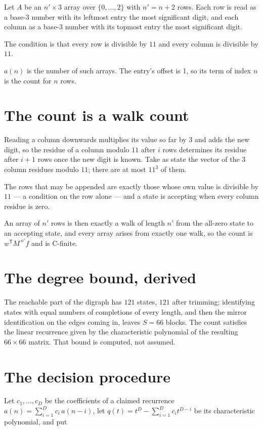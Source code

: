 \documentclass[11pt]{article}
\theoremstyle{definition}
\begin{document}
Let $A$ be an $n' \times 3$ array over $\{0,\dots,2\}$ with $n' = n + 2$ rows. Each row is read as a base-$3$ number with its leftmost entry the most significant digit, and each column as a base-$3$ number with its topmost entry the most significant digit.

The condition is that every row is divisible by $11$ and every column is divisible by $11$.

$a(n)$ is the number of such arrays. The entry's offset is 1, so its term of index $n$ is the count for $n$ rows.

\section{The count is a walk count}

Reading a column downwards multiplies its value so far by $3$ and adds the new digit, so the residue of a column modulo $11$ after $i$ rows determines its residue after $i+1$ rows once the new digit is known. Take as state the vector of the $3$ column residues modulo $11$; there are at most $11^{3}$ of them.

The rows that may be appended are exactly those whose own value is divisible by $11$ --- a condition on the row alone --- and a state is accepting when every column residue is zero.

An array of $n'$ rows is then exactly a walk of length $n'$ from the all-zero state to an accepting state, and every array arises from exactly one walk, so the count is $w^{\mathsf T}M^{\,n'}f$ and is C-finite.

\section{The degree bound, derived}

The reachable part of the digraph has $121$ states, $121$ after trimming; identifying states with equal numbers of completions of every length, and then the mirror identification on the edges coming in, leaves $S = 66$ blocks. The count satisfies the linear recurrence given by the characteristic polynomial of the resulting $66\times66$ matrix. That bound is computed, not assumed.

\section{The decision procedure}

Let $c_1,\dots,c_D$ be the coefficients of a claimed recurrence $a(n) = \sum_{i=1}^{D} c_i\,a(n-i)$, let $q(t) = t^{D} - \sum_{i=1}^{D} c_i t^{D-i}$ be its characteristic polynomial, and put
\end{document}
